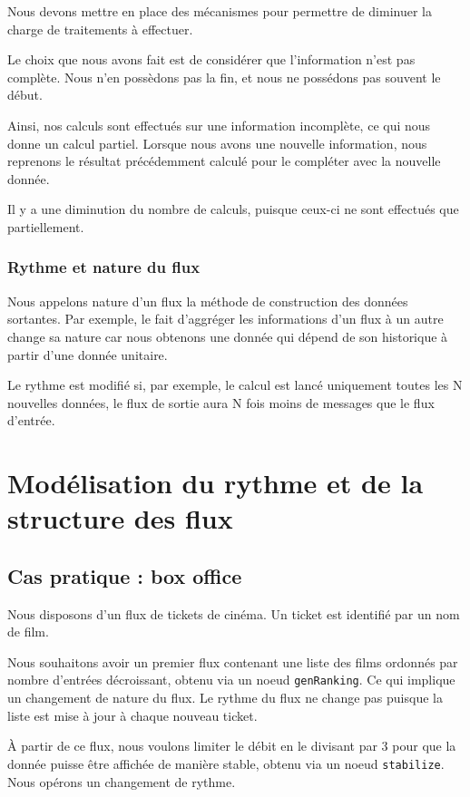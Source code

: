 \documentclass{llncs}
\begin{document}
Nous devons mettre en place des mécanismes pour permettre de diminuer la charge
de traitements à effectuer.

Le choix que nous avons fait est de considérer que l'information n'est pas complète.
Nous n'en possèdons pas la fin, et nous ne possédons pas souvent le début.

Ainsi, nos calculs sont effectués sur une information incomplète, ce qui nous
donne un calcul partiel.
Lorsque nous avons une nouvelle information, nous reprenons le résultat
précédemment calculé pour le compléter avec la nouvelle donnée.

Il y a une diminution du nombre de calculs, puisque ceux-ci ne sont effectués
que partiellement.

\subsubsection{Rythme et nature du flux}
Nous appelons nature d'un flux la méthode de construction des données sortantes.
Par exemple, le fait d'aggréger les informations d'un flux à un autre change
sa nature car nous obtenons une donnée qui dépend de son historique
à partir d'une donnée unitaire.

Le rythme est modifié si, par exemple, le calcul est lancé uniquement toutes les
N nouvelles données, le flux de sortie aura N fois moins de messages que le flux d'entrée.

\section{Modélisation du rythme et de la structure des flux}
\subsection{Cas pratique : box office}
Nous disposons d'un flux de tickets de cinéma.
Un ticket est identifié par un nom de film.

Nous souhaitons avoir un premier flux contenant une liste des films ordonnés par
nombre d'entrées décroissant, obtenu via un noeud \lstinline{genRanking}.
Ce qui implique un changement de nature du flux.
Le rythme du flux ne change pas puisque la liste est mise à jour à chaque nouveau
ticket.

À partir de ce flux, nous voulons limiter le débit en le divisant par 3 pour
que la donnée puisse être affichée de manière stable, obtenu via un noeud \lstinline{stabilize}.
Nous opérons un changement de rythme.
\end{document}
